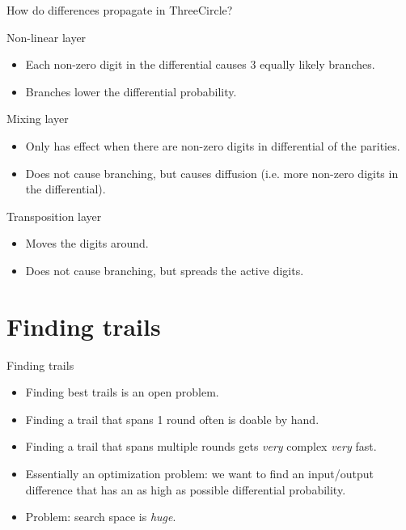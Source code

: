 \documentclass{beamer}
\begin{document}
\begin{frame}{How do differences propagate in ThreeCircle?}
\begin{block}{Non-linear layer}
\begin{itemize}
    \item Each non-zero digit in the differential causes 3 equally likely branches.
    \item Branches lower the differential probability.
\end{itemize}
\end{block}

\begin{block}{Mixing layer}
\begin{itemize}
    \item Only has effect when there are non-zero digits in differential of the parities.
    \item Does not cause branching, but causes diffusion (i.e. more non-zero digits in the differential).
\end{itemize}
\end{block}

\begin{block}{Transposition layer}
\begin{itemize}
    \item Moves the digits around.
    \item Does not cause branching, but spreads the active digits.
\end{itemize}
\end{block}
\end{frame}

\section{Finding trails}

\begin{frame}{Finding trails}
\begin{itemize}
\item Finding best trails is an open problem.
\item Finding a trail that spans 1 round often is doable by hand.
\item Finding a trail that spans multiple rounds gets \emph{very} complex \emph{very} fast.
\item Essentially an optimization problem: we want to find an input/output difference that has an as high as possible differential probability.
\item Problem: search space is \emph{huge}.
\end{itemize}
\end{frame}
\end{document}
